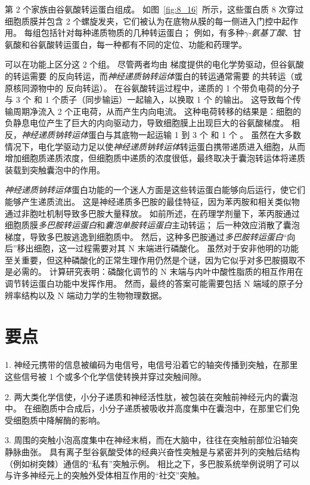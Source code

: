第 2 个家族由谷氨酸转运蛋白组成。
如图~\ref{fig:8_16}~所示，这些蛋白质 8 次穿过细胞质膜并包含 2 个螺旋发夹，它们被认为在底物从膜的每一侧进入门控中起作用。
每组包括针对每种递质物质的几种转运蛋白；
例如，有多种\textit{$\gamma$-氨基丁酸}、甘氨酸和谷氨酸转运蛋白，每一种都有不同的定位、功能和药理学。


可以在功能上区分这 2 个组。
尽管两者均由  梯度提供的电化学势驱动，但谷氨酸的转运需要  的反向转运，而\textit{神经递质钠转运体}蛋白的转运通常需要  的共转运（或原核同源物中的  反向转运）。
在谷氨酸转运过程中，递质的 1 个带负电荷的分子与 3 个  和 1 个质子（同步输运）一起输入，以换取 1 个  的输出。
这导致每个传输周期净流入 2 个正电荷，从而产生内向电流。
这种电荷转移的结果是：细胞的负静息电位产生了巨大的内向驱动力，导致细胞膜上出现巨大的谷氨酸梯度。
相反，\textit{神经递质钠转运体}蛋白与其底物一起运输 1 到 3 个  和 1 个 。
虽然在大多数情况下，电化学驱动力足以使\textit{神经递质钠转运体}转运蛋白携带递质进入细胞，从而增加细胞质递质浓度，但细胞质中递质的浓度很低，最终取决于囊泡转运体将递质装载到突触囊泡中的作用。


\textit{神经递质钠转运体}蛋白功能的一个迷人方面是这些转运蛋白能够向后运行，使它们能够产生递质流出。
这是神经递质多巴胺的最佳特征，因为苯丙胺和相关类似物通过非胞吐机制导致多巴胺大量释放。
如前所述，在药理学剂量下，苯丙胺通过细胞质膜\textit{多巴胺转运蛋白}和\textit{囊泡单胺转运蛋白}主动转运；
后一种效应消散了囊泡  梯度，导致多巴胺逃逸到细胞质中。
然后，这种多巴胺通过\textit{多巴胺转运蛋白}“向后”移出细胞，这一过程需要对其 N 末端进行磷酸化。
虽然对于安非他明的功能至关重要，但这种磷酸化的正常生理作用仍然是个谜，因为它似乎对多巴胺摄取不是必需的。
计算研究表明：磷酸化调节的 N 末端与内叶中酸性脂质的相互作用在调节转运蛋白功能中发挥作用。
然而，最终的答案可能需要包括 N 端域的原子分辨率结构以及 N 端动力学的生物物理数据。



\section{要点}

1. 神经元携带的信息被编码为电信号，电信号沿着它的轴突传播到突触，在那里这些信号被 1 个或多个化学信使转换并穿过突触间隙。


2. 两大类化学信使，小分子递质和神经活性肽，被包装在突触前神经元内的囊泡中。
在细胞质中合成后，小分子递质被吸收并高度集中在囊泡中，在那里它们免受细胞质中降解酶的影响。


3. 周围的突触小泡高度集中在神经末梢，而在大脑中，往往在突触前部位沿轴突静脉曲张。
具有离子型谷氨酸受体的经典兴奋性突触是与紧密并列的突触后结构（例如树突棘）通信的“私有”突触示例。
相比之下，多巴胺系统举例说明了可以与许多神经元上的突触外受体相互作用的“社交”突触。


